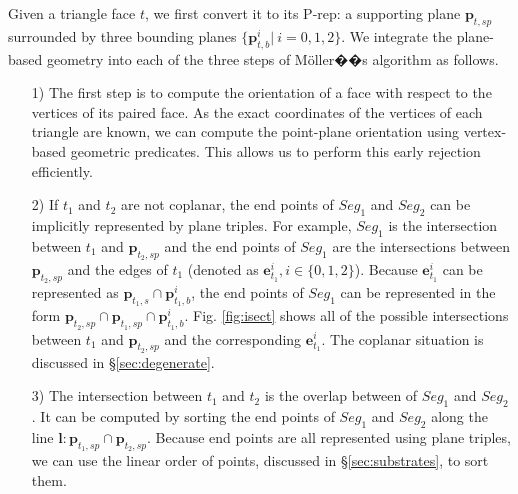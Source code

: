 Given a triangle face $t$, we first convert it to its P-rep: a supporting plane $\bm{p}_{t, sp}$  surrounded by three bounding planes $\{\bm{p}_{t, b}^i|\ i = 0,1,2\}$. We integrate the plane-based geometry into each of the three steps of M\"{o}ller��s algorithm as follows.
\begin{itemize}[leftmargin=0.45cm]
  \item[1)] The first step is to compute the orientation of a face with respect to the vertices of its paired face. As the exact coordinates of the vertices of each triangle are known, we can compute the point-plane orientation using vertex-based geometric predicates. This allows us to perform this early rejection efficiently.
      \vspace{0.5em}
  \item[2)] If $t_1$ and $t_2$ are not coplanar, the end points of $Seg_1$ and $Seg_2$ can be implicitly represented by plane triples. For example, $Seg_1$ is the intersection between $t_1$ and $\bm{p}_{t_2, sp}$ and the end points of $Seg_1$ are the intersections between $\bm{p}_{t_2, sp}$ and the edges of $t_1$ (denoted as $\bm{e}^i_{t_1}, i\in\{0,1,2\}$). Because $\bm{e}^i_{t_1}$ can be represented as $\bm{p}_{t_1, s}\cap \bm{p}^i_{t_1, b}$, the end points of $Seg_1$ can be represented in the form $\bm{p}_{t_2, sp} \cap \bm{p}_{t_1, sp} \cap \bm{p}^i_{t_1, b}$. Fig. \ref{fig:isect} shows all of the possible intersections between $t_1$ and $\bm{p}_{t_2, sp}$ and the corresponding $\bm{e}^i_{t_1}$. The coplanar situation is discussed in \S \ref{sec:degenerate}.
      \vspace{0.5em}
 \item[3)] The intersection between $t_1$ and $t_2$ is the overlap between of $Seg_1$ and $Seg_2$. It can be computed by sorting the end points of $Seg_1$ and $Seg_2$ along the line $\bm{l}\colon \bm{p}_{t_1, sp} \cap \bm{p}_{t_2, sp}$. Because end points are all represented using plane triples, we can use the linear order of points, discussed in \S \ref{sec:substrates}, to sort them.

\end{itemize}

